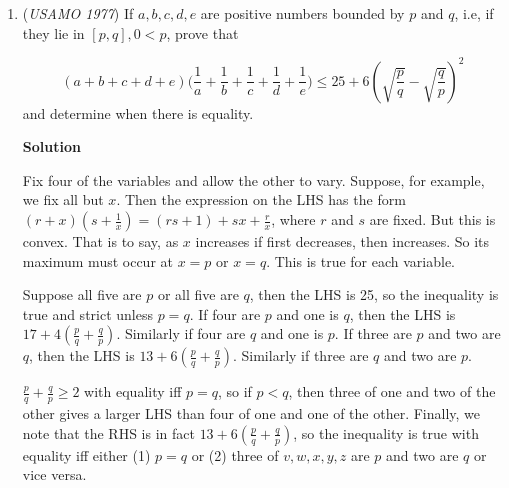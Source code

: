 \begin{enumerate}
 


	\item (\textit{USAMO 1977}) If $a,b,c,d,e$ are positive numbers bounded by $p$ and $q$, i.e, if they lie in $[p,q], 0 < p$, prove that

 \[(a + b + c + d + e)\biggl(\frac {1}{a} + \frac {1}{b} + \frac {1}{c} + \frac {1}{d} + \frac {1}{e}\biggr) \le 25 + 6\left(\sqrt {\frac {p}{q}} - \sqrt {\frac {q}{p}}\right)^2\]
and determine when there is equality.


 



\textbf{Solution}

Fix four of the variables and allow the other to vary. Suppose, for example, we fix all but $x$. Then the expression on the LHS has the form $(r + x)(s + \frac{1}{x}) = (rs + 1) + sx + \frac{r}{x}$, where $r$ and $s$ are fixed. But this is convex. That is to say, as $x$ increases if first decreases, then increases. So its maximum must occur at $x = p$ or $x = q$. This is true for each variable.

 Suppose all five are $p$ or all five are $q$, then the LHS is 25, so the inequality is true and strict unless $p = q$. If four are $p$ and one is $q$, then the LHS is $17 + 4\left(\frac{p}{q} + \frac{q}{p}\right)$. Similarly if four are $q$ and one is $p$. If three are $p$ and two are $q$, then the LHS is $13 + 6\left(\frac{p}{q} + \frac{q}{p}\right)$. Similarly if three are $q$ and two are $p$.

 $\frac{p}{q} + \frac{q}{p} \geq 2$ with equality iff $p = q$, so if $p < q$, then three of one and two of the other gives a larger LHS than four of one and one of the other. Finally, we note that the RHS is in fact $13 + 6\left(\frac{p}{q} + \frac{q}{p}\right)$, so the inequality is true with equality iff either (1) $p = q$ or (2) three of $v, w, x, y, z$ are $p$ and two are $q$ or vice versa.

 


\end{enumerate}